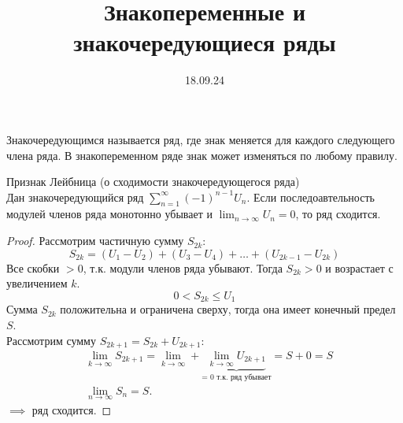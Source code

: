 

\title{Знакопеременные и знакочередующиеся ряды}
\date{18.09.24}


\maketitle
\begin{remark}
    Знакочередующимся называется ряд, где знак меняется 
    для каждого следующего члена ряда. В знакопеременном ряде 
    знак может изменяться по любому правилу.
\end{remark}

\begin{thm}
    Признак Лейбница (о сходимости знакочередующегося ряда)\\
    Дан знакочередующийся ряд \(\sum_{n=1}^{\infty} (-1)^{n-1} U_{n}\). 
    Если последоавтельность модулей членов ряда монотонно убывает 
    и \(\lim_{n\to\infty} U_{n}=0\), то ряд сходится.
    \begin{proof}
        Рассмотрим частичную сумму \(S_{2k}\):
        \begin{equation}
            S_{2k} = (U_{1} - U_{2}) + (U_{3} - U_{4}) + 
            \dots + (U_{2k - 1} - U_{2k})
        \end{equation}
        Все скобки \(>0\), т.к. модули членов ряда убывают. 
        Тогда \(S_{2k} > 0\) и возрастает с увеличением \(k\).
        \begin{equation}
            0 < S_{2k} \leq U_{1}
        \end{equation}
        Сумма \(S_{2k}\) положительна и ограничена сверху, 
        тогда она имеет конечный предел \(S\). \\
        Рассмотрим сумму \(S_{2k+1} = S_{2k} + U_{2k+1}\):
        \begin{equation}
            \begin{align*}
                &\lim_{k\to\infty} S_{2k+1} = \lim_{k\to\infty} + \underbrace{\lim_{k\to\infty}U_{2k+1}}_{\text{= 0 т.к. ряд убывает}} = S+0= S\\
                &\lim_{n\to\infty}S_{n} = S.
            \end{align*}
        \end{equation}
        \(\implies\) ряд сходится.
    \end{proof}

    \begin{corollary}
        
    \end{corollary}
\end{thm}



